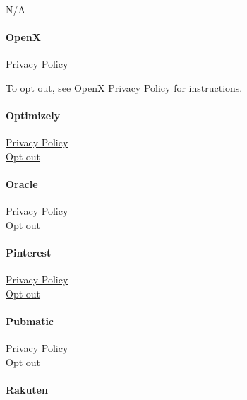 N/A

\hypertarget{openx}{%
\paragraph{OpenX}\label{openx}}

\href{https://www.openx.com/legal/privacy-policy/}{Privacy Policy}

To opt out, see \href{https://www.openx.com/legal/privacy-policy/}{OpenX
Privacy Policy} for instructions.

\hypertarget{optimizely}{%
\paragraph{Optimizely}\label{optimizely}}

\href{https://www.optimizely.com/privacy/}{Privacy Policy}\\
\href{https://www.optimizely.com/legal/opt-out/}{Opt out}

\hypertarget{oracle}{%
\paragraph{Oracle}\label{oracle}}

\href{https://www.oracle.com/legal/privacy/marketing-cloud-data-cloud-privacy-policy.html}{Privacy
Policy}\\
\href{https://datacloudoptout.oracle.com/\#optout}{Opt out}

\hypertarget{pinterest}{%
\paragraph{Pinterest}\label{pinterest}}

\href{https://policy.pinterest.com/en/privacy-policy}{Privacy Policy}\\
\href{https://help.pinterest.com/en/article/personalization-and-data}{Opt
out}

\hypertarget{pubmatic}{%
\paragraph{Pubmatic}\label{pubmatic}}

\href{https://pubmatic.com/legal/privacy-policy/}{Privacy Policy}\\
\href{https://pubmatic.com/legal/opt-out/}{Opt out}

\hypertarget{rakuten}{%
\paragraph{Rakuten}\label{rakuten}}

